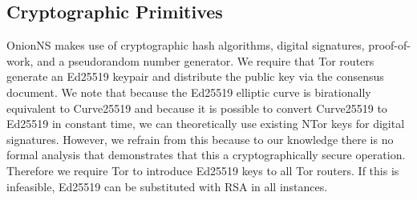 \documentclass{sig-alternate}
\begin{document}
\newpage

\subsection{Cryptographic Primitives}

OnionNS makes use of cryptographic hash algorithms, digital signatures, proof-of-work, and a pseudorandom number generator. We require that Tor routers generate an Ed25519\cite{bernstein2011high} keypair and distribute the public key via the consensus document. We note that because the Ed25519 elliptic curve is birationally equivalent to Curve25519 and because it is possible to convert Curve25519 to Ed25519 in constant time, we can theoretically use existing NTor keys for digital signatures. However, we refrain from this because to our knowledge there is no formal analysis that demonstrates that this a cryptographically secure operation. Therefore we require Tor to introduce Ed25519 keys to all Tor routers. If this is infeasible, Ed25519 can be substituted with RSA in all instances.
\end{document}
